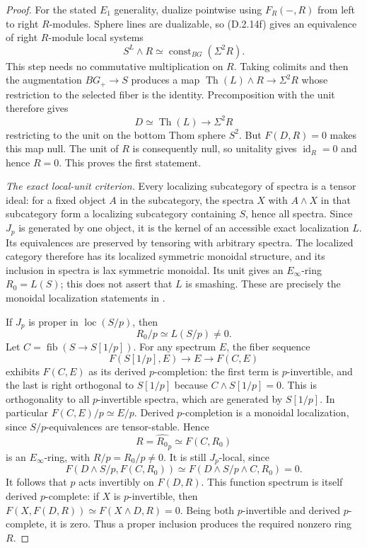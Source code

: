 \begin{proof}
For the stated $E_1$ generality, dualize pointwise using
$F_R(-,R)$ from left to right $R$-modules. Sphere lines are
dualizable, so \textup{(D.2.14f)} gives an equivalence of right
$R$-module local systems
\[
 S^L\wedge R\simeq
          \operatorname{const}_{BG}(\Sigma^2R).
\]
This step needs no commutative multiplication on $R$.
Taking colimits and then the augmentation $BG_+\to S$ produces a
map $\operatorname{Th}(L)\wedge R\to\Sigma^2R$ whose restriction
to the selected fiber is the identity. Precomposition with the unit
therefore gives
\[
 D\simeq\operatorname{Th}(L)\longrightarrow\Sigma^2R
\]
restricting to the unit on the bottom Thom sphere $S^2$.
But $F(D,R)=0$ makes this map null. The unit of $R$ is consequently
null, so unitality gives $\operatorname{id}_R=0$ and hence $R=0$.
This proves the first statement.

\emph{The exact local-unit criterion.}
Every localizing subcategory of spectra is a tensor ideal: for a
fixed object $A$ in the subcategory, the spectra $X$ with
$A\wedge X$ in that subcategory form a localizing subcategory
containing $S$, hence all spectra. Since $J_p$ is generated by one
object, it is the kernel of an accessible exact localization $L$.
Its equivalences are preserved by tensoring with arbitrary spectra.
The localized category therefore has its localized symmetric
monoidal structure, and its inclusion in spectra is lax symmetric
monoidal. Its unit gives an $E_\infty$-ring $R_0=L(S)$; this does
not assert that $L$ is smashing. These are precisely the monoidal
localization statements in
\cite[Example 2.2.1.7, Proposition 2.2.1.9]{FGHLurieHA}.

If $J_p$ is proper in $\operatorname{loc}(S/p)$, then
\[
 R_0/p\simeq L(S/p)\ne0.
\]
Let $C=\operatorname{fib}(S\to S[1/p])$. For any spectrum $E$,
the fiber sequence
\[
 F(S[1/p],E)\longrightarrow E\longrightarrow F(C,E)
\]
exhibits $F(C,E)$ as its derived $p$-completion: the first term is
$p$-invertible, and the last is right orthogonal to $S[1/p]$ because
$C\wedge S[1/p]=0$. This is orthogonality to all $p$-invertible
spectra, which are generated by $S[1/p]$.
In particular $F(C,E)/p\simeq E/p$.
Derived $p$-completion is a monoidal localization, since
$S/p$-equivalences are tensor-stable. Hence
\[
 R=\widehat{R_0}_p\simeq F(C,R_0)
\]
is an $E_\infty$-ring, with $R/p=R_0/p\ne0$.
It is still $J_p$-local, since
\[
 F(D\wedge S/p,F(C,R_0))
   \simeq F(D\wedge S/p\wedge C,R_0)=0.
\]
It follows that $p$ acts invertibly on $F(D,R)$.
This function spectrum is itself derived $p$-complete: if $X$ is
$p$-invertible, then
$F(X,F(D,R))\simeq F(X\wedge D,R)=0$.
Being both $p$-invertible and derived $p$-complete, it is zero.
Thus a proper inclusion produces the required nonzero ring $R$.


\end{proof}
